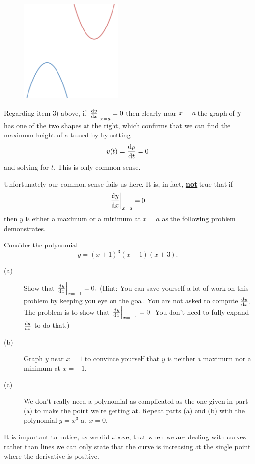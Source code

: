 \begin{figure}
\captionsetup{labelformat=empty}
\centerline{\includegraphics*[height=2in,width=2in]{Figures/MaxMin1}}
\label{fig:MaxMin1}
\end{figure}
Regarding item 3) above, if
$\left.{}\frac{\text{d}{y}}{\text{d}{x}}\right|_{x=a}=0$ then clearly near $x=a$ the graph of $y$ has
one of the two shapes at the right, which confirms that we can find
the maximum height of a tossed by by setting 
$$
v(t) = \frac{\text{d}{p}}{\text{d}{t}} =0
$$
and solving for $t.$ This is only common sense.

Unfortunately our common sense fails us here. It is, in fact,
\underline{\bf not} true that if
$$
\left.{}\frac{\text{d}{y}}{\text{d}{x}}\right|_{x=a}=0
$$ 
then $y$ is either a maximum or a minimum at $x=a$ as the following
problem demonstrates.
\begin{embeddedproblem}{}
  Consider the polynomial
$$
y = (x+1)^3(x-1)(x+3).
$$
\begin{description}
\item[(a)] Show that $\left.{}\frac{\text{d}{y}}{\text{d}{x}}\right|_{x=-1}=0.$ (Hint: You can save
  yourself a lot of work on this problem by keeping you eye on the
  goal. You are not asked to compute $\frac{\text{d}{y}}{\text{d}{x}}.$ The problem is to
  show that $\left.\frac{\text{d}{y}}{\text{d}{x}}\right|_{x=-1}=0.$ You don't need to
  fully expand $\frac{\text{d}{y}}{\text{d}{x}}$ to do that.)
\item[(b)]  Graph $y$ near $x=1$ to convince yourself that $y$ is
  neither a maximum nor a minimum at $x=-1$.
\item[(c)] We don't really need a polynomial as complicated as the one
  given in part (a) to make the point we're getting at. Repeat parts
  (a) and (b) with the polynomial $y=x^3$ at $x=0.$
\end{description}

\end{embeddedproblem}

It is important to notice, as we did above, that when we are dealing
with curves rather than lines we can only state that the curve is
increasing at the single point where the derivative is positive.


